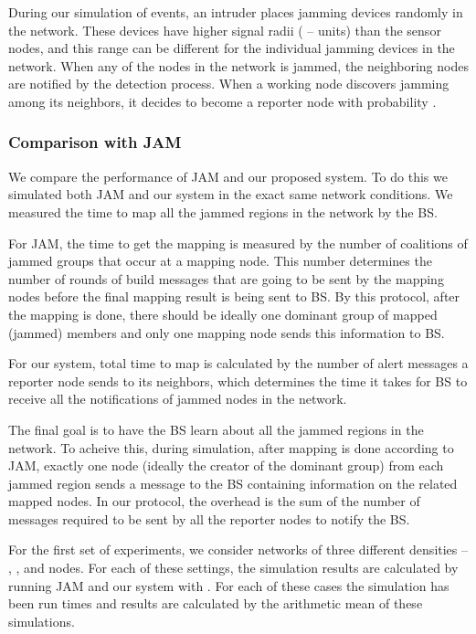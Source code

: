 \documentclass[conference]{IEEEtran}
\begin{document}
During our simulation of events, an intruder places jamming devices randomly in the network. These devices have higher signal radii ( --  units) than the sensor nodes, and this range can be different for the individual jamming devices in the network. When any of the nodes in the network is jammed, the neighboring nodes are notified by the detection process. When a working node discovers jamming among its neighbors, it decides to become a reporter node with probability .

\subsubsection{Comparison with JAM} We compare the performance of JAM \cite{JAM} and our proposed system. To do this we simulated both JAM and our system in the exact same network conditions.
\newline
{} We measured the time to map all the jammed regions in the network by the BS. 

For JAM, the time to get the mapping is measured by the number of coalitions of jammed groups that occur at a mapping node. This number determines the number of rounds of build messages that are going to be sent by the mapping nodes before the final mapping result is being sent to BS. By this protocol, after the mapping is done, there should be ideally one dominant group of mapped (jammed) members and only one mapping node sends this information to BS.

For our system, total time to map is calculated by the number of alert messages a reporter node sends to its neighbors, which determines the time it takes for BS to receive all the notifications of jammed nodes in the network. \newline

The final goal is to have the BS learn about all the jammed regions in the network. To acheive this, during simulation, after mapping is done according to JAM, exactly one node (ideally the creator of the dominant group) from each jammed region sends a message to the BS containing information on the related mapped nodes. In our protocol, the overhead is the sum of the number of messages required to be sent by all the reporter nodes to notify the BS.

For the first set of experiments, we consider networks of three different densities -- , , and  nodes. For each of these settings, the simulation results are calculated by running JAM and our system with . For each of these cases the simulation has been run  times and results are calculated by the arithmetic mean of these simulations. 
\end{document}
